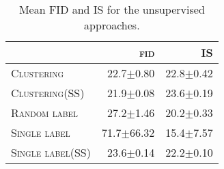 \documentclass{article}
\newcommand{\tranC}{\textsc{Clustering}}
\newcommand{\slabels}{\textsc{Single label}}
\newcommand{\rlabels}{\textsc{Random label}}
\begin{document}
\begin{table}[h]
\centering
\caption{Mean FID and IS for the unsupervised approaches.\vspace{0.2cm}}
\label{tab:unsupervised_fid_is_mean_std}
\setlength\tabcolsep{4.5pt}
\begin{tabular}{lrr}
\toprule
{} & \textsc{fid} & \textsc{IS} \\\midrule
\tranC     &   22.7$\pm$0.80 &  22.8$\pm$0.42 \\
\tranC (SS) &   21.9$\pm$0.08 &  23.6$\pm$0.19 \\
\rlabels          &   27.2$\pm$1.46 &  20.2$\pm$0.33 \\
\slabels          &  71.7$\pm$66.32 &  15.4$\pm$7.57 \\
\slabels (SS)     &   23.6$\pm$0.14 &  22.2$\pm$0.10 \\
\bottomrule
\end{tabular} \end{table}
\end{document}
